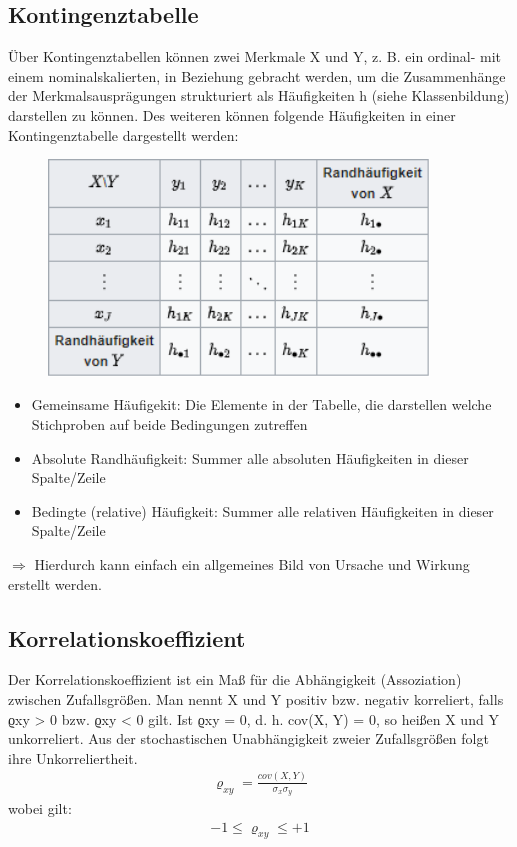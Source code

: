 \documentclass[a4paper,10pt]{scrartcl}
\begin{document}
\subsection{Kontingenztabelle}
Über Kontingenztabellen können zwei Merkmale X und Y, z. B. ein ordinal- mit einem nominalskalierten, in Beziehung gebracht werden, um die Zusammenhänge der Merkmalsausprägungen strukturiert als Häufigkeiten h (siehe Klassenbildung) darstellen zu können. Des weiteren können folgende Häufigkeiten in einer Kontingenztabelle dargestellt werden:
\begin{figure}[h] 
  \centering
    \includegraphics[width=0.9\textwidth]{Kontingenztabelle.PNG}
  \label{fig:Bild1}
\end{figure}
\begin{itemize}
    \item Gemeinsame Häufigekit: Die Elemente in der Tabelle, die darstellen welche Stichproben auf beide Bedingungen zutreffen
    \item Absolute Randhäufigkeit: Summer alle absoluten Häufigkeiten in dieser Spalte/Zeile
    \item Bedingte (relative) Häufigkeit: Summer alle relativen Häufigkeiten in dieser Spalte/Zeile
\end{itemize}
$\Rightarrow$ Hierdurch kann einfach ein allgemeines Bild von Ursache und Wirkung erstellt werden.
\subsection{Korrelationskoeffizient}
Der Korrelationskoeffizient ist ein Maß für die Abhängigkeit (Assoziation) zwischen Zufallsgrößen. Man nennt X und Y positiv bzw. negativ korreliert, falls ϱxy > 0 bzw. ϱxy < 0 gilt. Ist ϱxy = 0, d. h. cov(X, Y) = 0, so heißen X und Y unkorreliert. Aus der stochastischen Unabhängigkeit zweier Zufallsgrößen folgt ihre Unkorreliertheit.
\begin{eqnarray}{\varrho }_{xy}=\frac{cov(X,Y)}{{\sigma }_{x}{\sigma }_{y}}\end{eqnarray} wobei gilt:
\begin{eqnarray}-1\le {\varrho }_{xy}\le +1\end{eqnarray}
\end{document}
